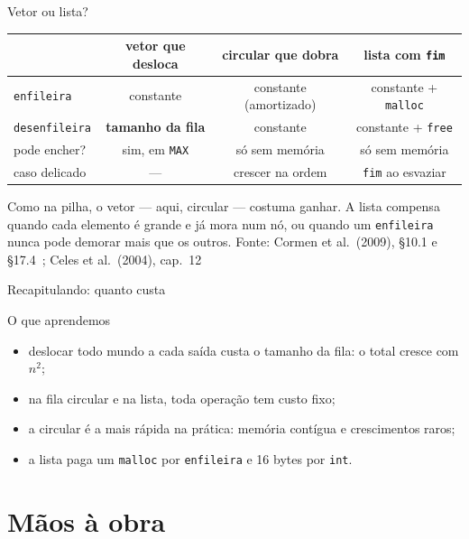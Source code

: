 \documentclass[aspectratio=169]{beamer}
\newcommand{\fonte}[1]{\vfill\hfill{\scriptsize\textcolor{UFSGray}{Fonte: #1}}}
\begin{document}
\begin{frame}{Vetor ou lista?}
  \begin{center}
  \small
  \begin{tabular}{@{}lccc@{}}
    \toprule
    & vetor que desloca & circular que dobra & lista com \texttt{fim}\\
    \midrule
    \texttt{enfileira}           & constante & constante (amortizado) & constante + \texttt{malloc}\\
    \texttt{desenfileira}        & \textbf{tamanho da fila} & constante & constante + \texttt{free}\\
    pode encher?                 & sim, em \texttt{MAX} & só sem memória & só sem memória\\
    caso delicado                & --- & crescer na ordem & \texttt{fim} ao esvaziar\\
    \bottomrule
  \end{tabular}
  \end{center}
  \small Como na pilha, o vetor --- aqui, circular --- costuma ganhar. A lista
  compensa quando cada elemento é grande e já mora num nó, ou quando um
  \texttt{enfileira} nunca pode demorar mais que os outros.
  \fonte{Cormen et al.\ (2009), §10.1 e §17.4~\cite{cormen2009introduction};
    Celes et al.\ (2004), cap.~12~\cite{celes2004introducao}}
\end{frame}

\begin{frame}{Recapitulando: quanto custa}
  \begin{block}{O que aprendemos}
    \begin{itemize}
      \item deslocar todo mundo a cada saída custa o tamanho da fila: o
        total cresce com $n^2$;
      \item na fila circular e na lista, toda operação tem custo fixo;
      \item a circular é a mais rápida na prática: memória contígua e
        crescimentos raros;
      \item a lista paga um \texttt{malloc} por \texttt{enfileira} e 16
        bytes por \texttt{int}.
    \end{itemize}
  \end{block}
\end{frame}

\section{Mãos à obra}
\end{document}
